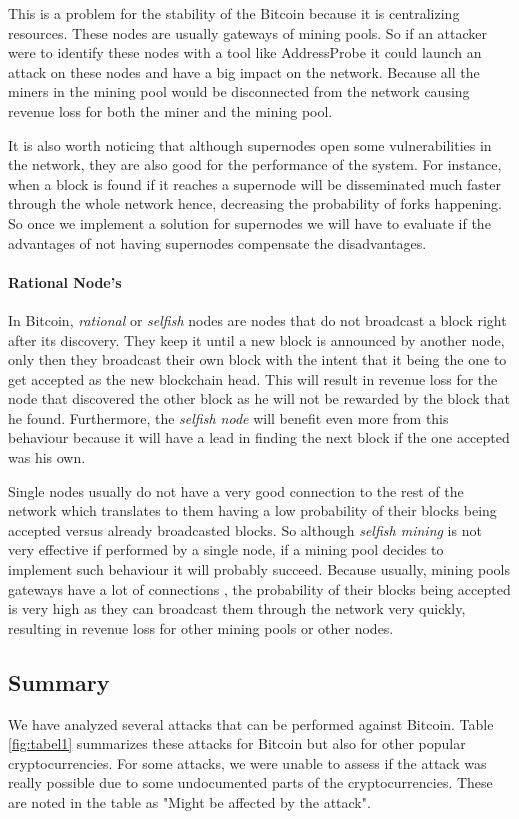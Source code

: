 This is a problem for the stability of the Bitcoin because it is centralizing resources. These nodes are usually gateways of mining pools. So if an attacker were to identify these nodes with a tool like AddressProbe \cite{miller2015discovering} it could launch an attack on these nodes and have a big impact on the network. Because all the miners in the mining pool would be disconnected from the network causing revenue loss for both the miner and the mining pool.

It is also worth noticing that although supernodes open some vulnerabilities in the network, they are also good for the performance of the system. For instance, when a block is found if it reaches a supernode will be disseminated much faster through the whole network hence, decreasing the probability of forks happening. So once we implement a solution for supernodes we will have to evaluate if the advantages of not having supernodes compensate the disadvantages.

\paragraph*{\textbf{Rational Node's}} In Bitcoin, \textit{rational} or \textit{selfish} nodes are nodes that do not broadcast a block right after its discovery. They keep it until a new block is announced by another node, only then they broadcast their own block with the intent that it being the one to get accepted as the new blockchain head. This will result in revenue loss for the node that discovered the other block as he will not be rewarded by the block that he found. Furthermore, the \textit{selfish node} will benefit even more from this behaviour because it will have a lead in finding the next block if the one accepted was his own.

Single nodes usually do not have a very good connection to the rest of the network which translates to them having a low probability of their blocks being accepted versus already broadcasted blocks. So although \textit{selfish mining} is not very effective if performed by a single node, if a mining pool decides to implement such behaviour it will probably succeed. Because usually, mining pools gateways have a lot of connections \cite{miller2015discovering}, the probability of their blocks being accepted is very high as they can broadcast them through the network very quickly, resulting in revenue loss for other mining pools or other nodes.


\subsection{Summary}
We have analyzed several attacks that can be performed against Bitcoin. Table \ref{fig:tabel1} summarizes these attacks for Bitcoin but also for other popular cryptocurrencies. For some attacks, we were unable to assess if the attack was really possible due to some undocumented parts of the cryptocurrencies. These are noted in the table as "Might be affected by the attack".

